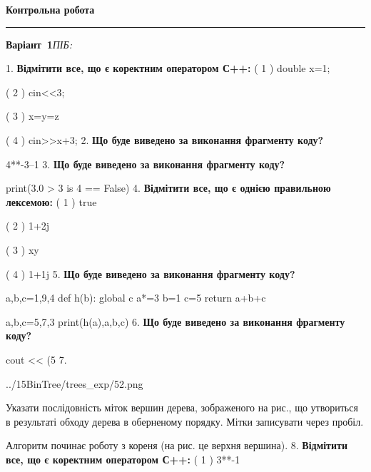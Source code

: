 \documentclass[11pt]{article}
\begin{document}
{\centering\Large\bfseries Контрольна робота\par}
\medskip
\noindent\rule{\linewidth}{0.5pt}
\smallskip
\noindent\textbf{Варіант \No\,1}\hfill \textit{ПІБ:}\,\underline{\hspace{60mm}}
\vspace{4mm}

1. %
\textbf{Відмітити все, що є коректним оператором С++:}
( 1 ) double x=1;

( 2 ) cin<<3;

( 3 ) x=y=z

( 4 ) cin>>x+3;
\vspace{5mm}
2. \textbf{Що буде виведено за виконання фрагменту коду?}

4**-3--1
\vspace{5mm}
3. \textbf{Що буде виведено за виконання фрагменту коду?}

print(3.0 > 3 is 4 == False)
\vspace{5mm}
4. %
\textbf{Відмітити все, що є однією правильною лексемою:}
( 1 ) true

( 2 ) 1+2j

( 3 ) xy

( 4 ) 1+1j
\vspace{5mm}
5. \textbf{Що буде виведено за виконання фрагменту коду?}

a,b,c=1,9,4
def h(b):
global c    a*=3
    b=1
    c=5
    return a+b+c

a,b,c=5,7,3
print(h(a),a,b,c)
\vspace{5mm}
6. \textbf{Що буде виведено за виконання фрагменту коду?}

cout << (5 %
\vspace{5mm}
7. 

\begin{center}
	{../15BinTree/trees_exp/52.png}
\end{center}
Указати послідовність міток вершин дерева, зображеного на рис., що утвориться в результаті обходу дерева в оберненому порядку. Мітки записувати через пробіл.\par Алгоритм починає роботу з кореня (на рис. це верхня вершина).
\vspace{5mm}
8. %
\textbf{Відмітити все, що є коректним оператором С++:}
( 1 ) 3**-1
\end{document}
